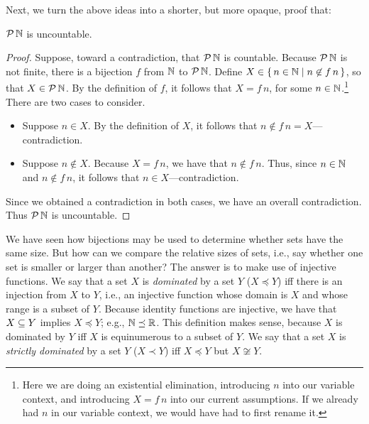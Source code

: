 Next, we turn the above ideas into a shorter, but more opaque, proof
that:

%
\begin{proposition}
\label{PowsetNatsUncountableProp}
${\cal P} \,\mathbb{N}$ is uncountable.
\end{proposition}

\begin{proof}
Suppose, toward a contradiction, that ${\cal P} \,\mathbb{N}$ is countable.
Because ${\cal P} \,\mathbb{N}$ is not finite, there is a bijection $f$
from $\mathbb{N}$ to ${\cal P} \,\mathbb{N}$.  Define
$X\in\{ \, n\in\mathbb{N} \mid n\not\in f\,n \, \}$, so that $X\in{\cal P} \,\mathbb{N}$.
By the definition of $f$, it follows that $X=f\,n$, for some
$n\in\mathbb{N}$.\footnote{Here we are doing an existential elimination,
introducing $n$ into our variable context, and introducing $X=f\,n$ into
our current assumptions. If we already had $n$ in our variable context, we
would have had to first rename it.}
%
%
%
%
There are two cases to consider.
\begin{itemize}
\item Suppose $n\in X$.  By the definition of $X$, it follows that
  $n\not\in f\,n=X$---contradiction.

\item Suppose $n\not\in X$.  Because $X=f\,n$, we have that $n\not\in
  f\,n$.  Thus, since $n\in\mathbb{N}$ and $n\not\in f\,n$, it follows
  that $n\in X$---contradiction.
\end{itemize}
Since we obtained a contradiction in both cases, we have
an overall contradiction. Thus ${\cal P} \,\mathbb{N}$ is uncountable.
\end{proof}

We have seen how bijections may be used to determine whether sets have
the same size.  But how can we compare the relative sizes of sets,
i.e., say whether one set is smaller or larger than another?  The
answer is to make use of injective functions.
%
%
We say that a set $X$ is \emph{dominated} by a set $Y$ ($X\preceq Y$)
%
%
iff there is an injection from $X$ to $Y$, i.e., an
injective function whose domain is $X$ and whose range
is a subset of $Y$. Because identity functions are injective,
we have that $X\subseteq Y$ implies $X\preceq Y$; e.g.,
$\mathbb{N}\preceq\mathbb{R}$.  This definition makes sense, because $X$ is
dominated by $Y$ iff $X$ is equinumerous to a subset of $Y$.
We say that a set $X$ is \emph{strictly dominated} by a set $Y$
%
%
($X\prec Y$)
%
%
iff $X\preceq Y$ but $X\not\cong Y$.

